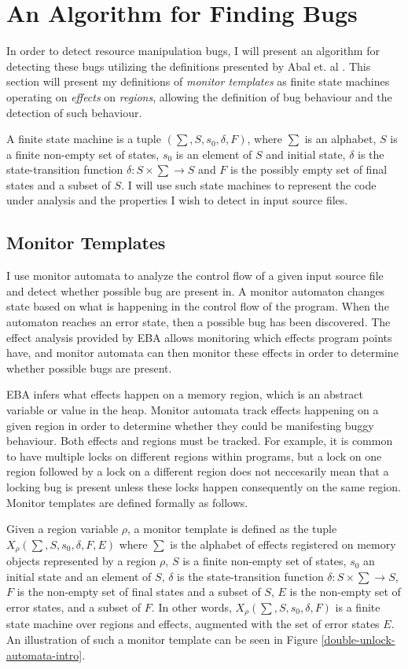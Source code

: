 \section{An Algorithm for Finding Bugs}
In order to detect resource manipulation bugs, I will present an algorithm for detecting these bugs utilizing the definitions presented by Abal et. al \cite{EffectiveBugFinding}. This section will present my definitions of \textit{monitor templates} as finite state machines operating on \textit{effects} on \textit{regions}, allowing the definition of bug behaviour and the detection of such behaviour. 

\newpar A finite state machine is a tuple $(\sum, S, s_0, \delta, F)$, where $\sum$ is an alphabet, $S$ is a finite non-empty set of states, $s_0$ is an element of $S$ and initial state, $\delta$ is the state-transition function $\delta: S \times \sum \rightarrow S$ and $F$ is the possibly empty set of final states and a subset of $S$. I will use such state machines to represent the code under analysis and the properties I wish to detect in input source files. 

\subsection{Monitor Templates}
\label{monitor-template-section}
\noindent I use monitor automata to analyze the control flow of a given input source file and detect whether possible bug are present in. A monitor automaton changes state based on what is happening in the control flow of the program. When the automaton reaches an error state, then a possible bug has been discovered. The effect analysis provided by EBA allows monitoring which effects program points have, and monitor automata can then monitor these effects in order to determine whether possible bugs are present. 

\newpar EBA infers what effects happen on a memory region, which is an abstract variable or value in the heap. Monitor automata track effects happening on a given region in order to determine whether they could be manifesting buggy behaviour. Both effects and regions must be tracked. For example, it is common to have multiple locks on different regions within programs, but a lock on one region followed by a lock on a different region does not neccesarily mean that a locking bug is present unless these locks happen consequently on the same region. Monitor templates are defined formally as follows. 

\newpar Given a region variable $\rho$, a monitor template is defined as the tuple $X_\rho (\sum, S, s_0, \delta, F, E)$ where $\sum$ is the alphabet of effects registered on memory objects represented by a region $\rho$, $S$ is a finite non-empty set of states, $s_0$ an initial state and an element of $S$, $\delta$ is the state-transition function $\delta: S \times \sum \rightarrow S$, $F$ is the non-empty set of final states and a subset of $S$, $E$ is the non-empty set of error states, and a subset of $F$. In other words, $X_\rho (\sum, S, s_0, \delta, F)$ is a finite state machine over regions and effects, augmented with the set of error states $E$. An illustration of such a monitor template can be seen in Figure \ref{double-unlock-automata-intro}.

